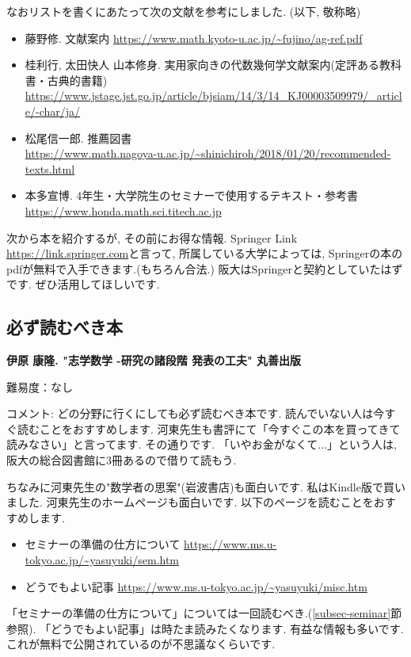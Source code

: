 なおリストを書くにあたって次の文献を参考にしました. (以下, 敬称略)
\vspace{-8pt}
\begin{itemize}[left=0pt]
  \setlength{\parskip}{0cm} %
  \setlength{\itemsep}{4pt} %
\item 藤野修. 文献案内 \url{https://www.math.kyoto-u.ac.jp/~fujino/ag-ref.pdf}
\item 桂利行, 太田快人 山本修身. 実用家向きの代数幾何学文献案内(定評ある教科書・古典的書籍) \url{https://www.jstage.jst.go.jp/article/bjsiam/14/3/14_KJ00003509979/_article/-char/ja/}
\item 松尾信一郎. 推薦図書 \\ \url{https://www.math.nagoya-u.ac.jp/~shinichiroh/2018/01/20/recommended-texts.html}
\item 本多宣博. 4年生・大学院生のセミナーで使用するテキスト・参考書 \\ \url{https://www.honda.math.sci.titech.ac.jp}
\end{itemize}


次から本を紹介するが, その前にお得な情報. 
Springer Link \url{https://link.springer.com}と言って, 所属している大学によっては, Springerの本のpdfが無料で入手できます.(もちろん合法.) 阪大はSpringerと契約としていたはずです. ぜひ活用してほしいです. 

\subsection{必ず読むべき本}

\textbf{伊原 康隆. "志学数学 -研究の諸段階 発表の工夫" 丸善出版} \vspace{-6pt}

難易度：なし \vspace{-6pt}

コメント: どの分野に行くにしても必ず読むべき本です. 読んでいない人は今すぐ読むことをおすすめします. 
河東先生も書評にて「今すぐこの本を買ってきて読みなさい」と言ってます. その通りです. 
「いやお金がなくて...」という人は, 阪大の総合図書館に3冊あるので借りて読もう. 

ちなみに河東先生の"数学者の思案"(岩波書店)も面白いです. 私はKindle版で買いました.
河東先生のホームページも面白いです. 以下のページを読むことをおすすめします. 
\begin{itemize}[left=0pt]
  \setlength{\parskip}{0cm} %
  \setlength{\itemsep}{0cm} %
\item セミナーの準備の仕方について \url{https://www.ms.u-tokyo.ac.jp/~yasuyuki/sem.htm}
\item どうでもよい記事 \url{https://www.ms.u-tokyo.ac.jp/~yasuyuki/misc.htm}
\end{itemize}
「セミナーの準備の仕方について」については一回読むべき.(\ref{subsec-seminar}節参照).  
「どうでもよい記事」は時たま読みたくなります. 有益な情報も多いです. これが無料で公開されているのが不思議なくらいです. 

